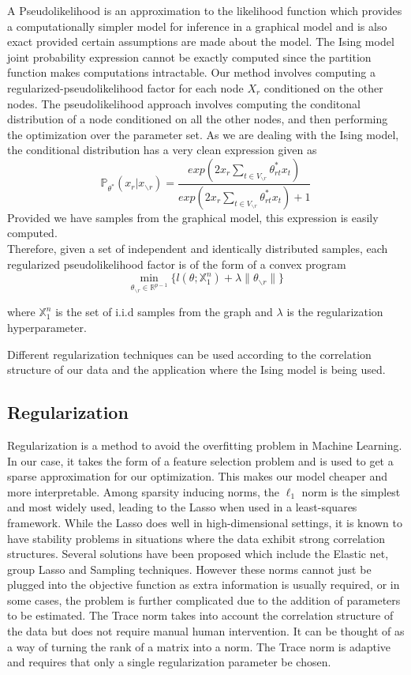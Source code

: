 \documentclass[11pt]{article}
\begin{document}
A Pseudolikelihood is an approximation to the likelihood function which provides a computationally simpler model for inference in a graphical model and is also exact provided certain assumptions are made about the model. 
The Ising model joint probability expression cannot be exactly computed since the partition function makes computations intractable.
Our method involves computing a regularized-pseudolikelihood factor for each node $X_r$ conditioned on the other nodes.
The pseudolikelihood approach involves computing the conditonal distribution of a node conditioned on all the other nodes, and then performing the optimization over the parameter set.
As we are dealing with the Ising model, the conditional distribution has a very clean expression given as 
$$ \mathbb{P_{\theta^*}}( x_r | x_{\backslash r}) = \frac{exp(2x_r \sum\limits_{t \in V_{\backslash r}} \theta^*_{rt} x_t )}{exp(2x_r \sum\limits_{t \in V_{\backslash r}} \theta^*_{rt} x_t ) + 1}  $$ 
Provided we have samples from the graphical model, this expression is easily computed.\\
Therefore, given a set of independent and identically distributed samples,  each regularized pseudolikelihood factor is of the form of a convex program 
$$ \min_{\theta_{\backslash r} \in \mathbb{R}^{p-1}} \{ l(\theta; \mathbb{X}^n_1) + \lambda \|{ \theta_{\backslash r} }\| \} $$

where $\mathbb{X}^n_1$ is the set of i.i.d samples from the graph and $\lambda$ is the regularization hyperparameter. 

Different regularization techniques can be used according to the correlation structure of our data and the application where the Ising model is being used.

\subsection{Regularization}

Regularization is a method to avoid the overfitting problem in Machine Learning. 
In our case, it takes the form of a feature selection problem and is used to get a sparse approximation for our optimization. 
This makes our model cheaper and more interpretable. 
Among sparsity inducing norms, the $\ell_1$ norm is the simplest and most widely used, leading to the Lasso when used in a least-squares framework.
While the Lasso does well in high-dimensional settings, it is known to have stability problems in situations where the data exhibit strong correlation structures. 
Several solutions have been proposed which include the Elastic net, group Lasso and Sampling techniques. 
However these norms cannot just be plugged into the objective function as extra information is usually required, or in some cases, the problem is further complicated due to the addition of parameters to be estimated. 
The Trace norm takes into account the correlation structure of the data but does not require manual human intervention. 
It can be thought of as a way of turning the rank of a matrix into a norm. The Trace norm is adaptive and requires that only a single regularization parameter be chosen. 	
\end{document}
